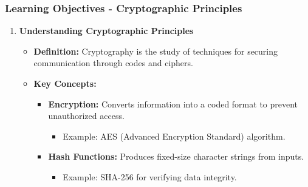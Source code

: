 \documentclass{beamer}
\begin{document}
\begin{frame}[fragile]
    \frametitle{Learning Objectives - Cryptographic Principles}
    \begin{enumerate}
        \item \textbf{Understanding Cryptographic Principles}
        \begin{itemize}
            \item \textbf{Definition:} Cryptography is the study of techniques for securing communication through codes and ciphers.
            \item \textbf{Key Concepts:}
            \begin{itemize}
                \item \textbf{Encryption:} Converts information into a coded format to prevent unauthorized access.
                \begin{itemize}
                    \item Example: AES (Advanced Encryption Standard) algorithm.
                \end{itemize}
                \item \textbf{Hash Functions:} Produces fixed-size character strings from inputs.
                \begin{itemize}
                    \item Example: SHA-256 for verifying data integrity.
                \end{itemize}
            \end{itemize}
        \end{itemize}
    \end{enumerate}
\end{frame}
\end{document}
